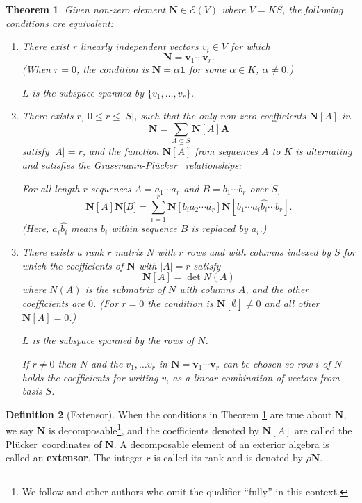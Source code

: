 \documentclass[12pt]{article}
\newtheorem{theorem}{Theorem}[section]
\theoremstyle{definition}
\newtheorem{definition}[theorem]{Definition}
\newcommand{\FieldK}{\ensuremath{K}}
\newcommand{\Card}[1]{\ensuremath{{\left|#1\right|}}}
\newcommand{\ext}[1]{\ensuremath{\mathbf{#1}}}
\newcommand{\Plucker}{Pl\"{u}cker\ }
\begin{document}
\begin{theorem}
\label{ExtTheory}
Given non-zero element $\ext{N}\in\mathcal{E}(V)$ where 
$V=\FieldK S$, the following conditions are equivalent:
\begin{enumerate}
\item
There exist $r$ linearly independent vectors $v_i\in V$ for which
\[
   \ext{N}=\ext{v}_1\cdots \ext{v}_r.
\]
(When $r=0$, the condition is $\ext{N}=\alpha\ext{1}$ for some
$\alpha\in\FieldK$, $\alpha\neq 0$.)

$L$ is the subspace spanned by $\{v_1,\ldots,v_r\}$.

\item
There exists $r$, $0\leq r \leq \Card{S}$, such that the only 
non-zero coefficients $\ext{N}[A]$ in
\[
\ext{N}=\sum_{A\subseteq S}\ext{N}[A]\ext{A}
\]
satisfy $\Card{A}=r$, and the function
$\ext{N}[A]$ from sequences $A$ to $\FieldK$ is alternating and
satisfies the \emph{Grassmann-\Plucker} relationships:

For all length $r$ sequences $A=a_1\cdots a_r$ and $B=b_1\cdots b_r$  over $S$,
\[
\ext{N}[A]\ext{N}\ext[B] = \sum_{i=1}^r 
\ext{N}[b_ia_2\cdots a_r] \ext{N}[b_1\cdots a_i\hat{b_i}\cdots b_r].
\]
(Here, $a_i\hat{b_i}$ means $b_i$ within sequence $B$ is replaced by $a_i$.)

\item There exists a rank $r$ matrix $N$ with $r$ rows and
with columns indexed by
$S$ for which the coefficients of $\ext{N}$ with 
$\Card{A}=r$ satisfy
\[
   \ext{N}[A] = \det N(A)
\]
where $N(A)$ is the submatrix of $N$ with columns $A$, and the other
coefficients are $0$.  (For $r=0$ the condition
is $\ext{N}[\emptyset]\neq 0$ and all other $\ext{N}[A]=0$.)

$L$ is the subspace spanned by the rows of $N$.

If $r\neq 0$ then $N$ and the $v_1,\ldots v_r$ in 
$\ext{N}=\ext{v}_1\cdots\ext{v}_r$
can be chosen so row $i$ of $N$ holds the coefficients for 
writing $v_i$ as a linear combination of vectors from basis $S$.  

\end{enumerate}
\end{theorem}

\begin{definition}[Extensor]
\label{ExtensorDef}
When the conditions in Theorem \ref{ExtTheory} are true about $\ext{N}$, we 
say $\ext{N}$ is decomposable\footnote{We follow \cite{JacobsonI} and other authors who
omit the qualifier ``fully'' in this context.}, and the coefficients denoted by
$\ext{N}[A]$ are called the \Plucker coordinates of $\ext{N}$.
A decomposable element of an exterior algebra is called an 
\textbf{extensor}.
The integer $r$ is called its rank and is denoted by $\rho\ext{N}$. 
\end{definition}
\end{document}
